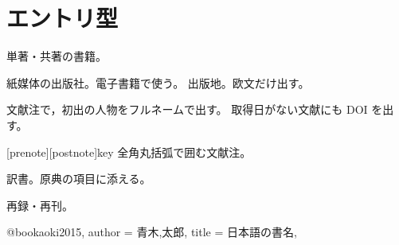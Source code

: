 \documentclass[a4paper,10pt,line_length=37zw,number_of_lines=40,oneside]{jlreq}
\begin{document}
\section{エントリ型}
\begin{typelist}
 単著・共著の書籍。
\end{typelist}
\begin{fieldlist}
 紙媒体の出版社。電子書籍で使う。
 出版地。欧文だけ出す。
\end{fieldlist}
\begin{optionlist}
 文献注で，初出の人物をフルネームで出す。
 取得日がない文献にも DOI を出す。
\end{optionlist}
\begin{ltxsyntax}
[prenote][postnote]{key} 全角丸括弧で囲む文献注。
\end{ltxsyntax}
\begin{keymarglist}
\item[translationof] 訳書。原典の項目に添える。
\item[reprintof] 再録・再刊。
\end{keymarglist}
\begin{ltxexample}
@book{aoki2015,
  author = {青木,太郎},
  title  = {日本語の書名},
}
\end{ltxexample}
\end{document}
